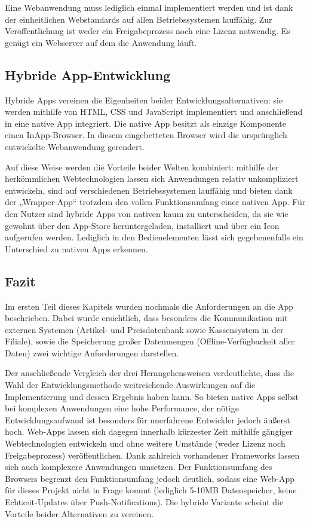 Eine Webanwendung muss lediglich einmal implementiert werden und ist dank der einheitlichen Webstandards auf allen Betriebssystemen lauffähig. Zur Veröffentlichung ist weder ein Freigabeprozess noch eine Lizenz notwendig. Es genügt ein Webserver auf dem die Anwendung läuft. 

\subsection{Hybride App-Entwicklung}
Hybride Apps vereinen die Eigenheiten beider Entwicklungsalternativen: sie werden mithilfe von HTML, CSS und JavaScript implementiert und anschließend in eine native App integriert. Die native App besitzt als einzige Komponente einen InApp-Browser. In diesem eingebetteten Browser wird die ursprünglich entwickelte Webanwendung gerendert.

Auf diese Weise werden die Vorteile beider Welten kombiniert: mithilfe der herkömmlichen Webtechnologien lassen sich Anwendungen relativ unkompliziert entwickeln, sind auf verschiedenen Betriebssystemen lauffähig und bieten dank der „Wrapper-App“ trotzdem den vollen Funktionsumfang einer nativen App. Für den Nutzer sind hybride Apps von nativen kaum zu unterscheiden, da sie wie gewohnt über den App-Store heruntergeladen, installiert und über ein Icon aufgerufen werden. Lediglich in den Bedienelementen lässt sich gegebenenfalls ein Unterschied zu nativen Apps erkennen.

\subsection{Fazit}
Im ersten Teil dieses Kapitels wurden nochmals die Anforderungen an die App beschrieben. Dabei wurde ersichtlich, dass besonders die Kommunikation mit externen Systemen (Artikel- und Preisdatenbank sowie Kassensystem in der Filiale), sowie die Speicherung großer Datenmengen (Offline-Verfügbarkeit aller Daten) zwei wichtige Anforderungen darstellen.

Der anschließende Vergleich der drei Herangehensweisen verdeutlichte, dass die Wahl der Entwicklungsmethode weitreichende Auswirkungen auf die Implementierung und dessen Ergebnis haben kann. So bieten native Apps selbst bei komplexen Anwendungen eine hohe Performance, der nötige Entwicklungsaufwand ist besonders für unerfahrene Entwickler jedoch äußerst hoch. Web-Apps lassen sich dagegen innerhalb kürzester Zeit mithilfe gängiger Webtechnologien entwickeln und ohne weitere Umstände (weder Lizenz noch Freigabeprozess) veröffentlichen. Dank zahlreich vorhandener Frameworks lassen sich auch komplexere Anwendungen umsetzen. Der Funktionsumfang des Browsers begrenzt den Funktionsumfang jedoch deutlich, sodass eine Web-App für dieses Projekt nicht in Frage kommt (lediglich 5-10MB Datenspeicher, keine Echtzeit-Updates über Push-Notifications). Die hybride Variante scheint die Vorteile beider Alternativen zu vereinen.

